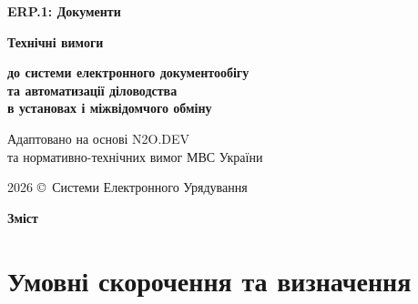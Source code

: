 \documentclass{article}
\newcommand\HUGE[1]{\fontsize{40}{40}\selectfont #1}
\begin{document}
\pagestyle{fancy}

\begin{titlepage}
  \AddToShipoutPictureBG*{\AtPageLowerLeft{\color{nato}\rule{\paperwidth}{\paperheight}}}
  \color{white}\thispagestyle{empty}\vspace*{3cm}\centering
  {\Huge  \textbf{ERP.1: Документи} \par} \vspace{1.5cm}
  {\HUGE  \textbf{Технічні вимоги} \par} \vspace{1.5cm}
  {\LARGE \textbf{до системи електронного документообігу \\ та автоматизації діловодства \\ в установах і міжвідомчого обміну} \par} \vspace{1.5cm}
  {\large Адаптовано на основі N2O.DEV \\ та нормативно-технічних вимог МВС України \par}
  \vfill
  {\large 2026 \copyright\ Системи Електронного Урядування \par}
\end{titlepage}

\newpage

\begin{center}
  {\Huge\color{nato}\bfseries Зміст\par}
\end{center}
\vspace{40pt}
\tableofcontents

\newpage

\section{Умовні скорочення та визначення}
\end{document}
